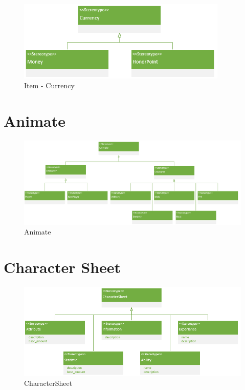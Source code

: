 \begin{figure}[H]
    \begin{center}
    \includegraphics[width=10cm]{10_img/Z_annexeA/item_currency.PNG} 
    \caption{Item - Currency}
    \label{A-Currency}
    \end{center}
\end{figure}


\section{Animate}
\begin{figure}[H]
    \begin{center}
    \includegraphics[width=\linewidth]{10_img/Z_annexeA/animate.PNG} 
    \caption{Animate}
    \label{A-Animate}
    \end{center}
\end{figure}



\section{Character Sheet} 
\begin{figure}[H]
    \begin{center}
    \includegraphics[width=\linewidth]{10_img/Z_annexeA/cs_racine.PNG} 
    \caption{CharacterSheet}
    \label{A-CS}
    \end{center}
\end{figure}

